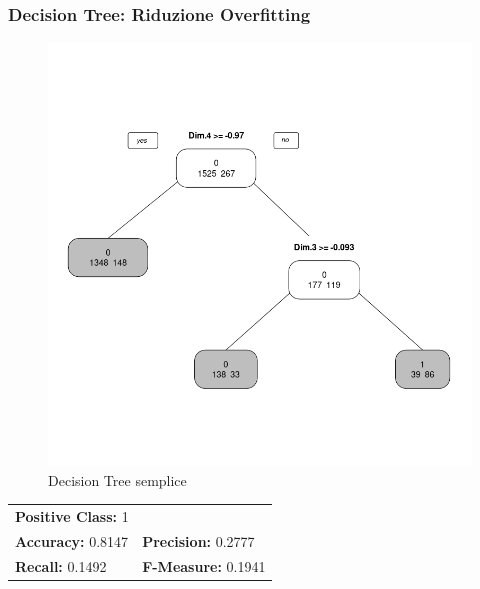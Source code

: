 \begin{frame}[fragile]
\frametitle{Decision Tree: Riduzione Overfitting}
\begin{minipage}{0.45\textwidth}
\begin{figure}
    \centering
    \includegraphics[width=\textwidth]{Img/decision tree/D-TREE002.png}
    \caption{Decision Tree semplice}
    \label{fig:DTREE2}
\end{figure}
\end{minipage}%
\hspace{2em}
\begin{minipage}{0.45\textwidth}

\begin{table}[h!]
\centering
\begin{tabular}{ll}
\multicolumn{2}{l}{\textbf{Positive Class:} 1} \\
\textbf{Accuracy:} 0.8147 & \textbf{Precision:} 0.2777\\
\textbf{Recall:} 0.1492 & \textbf{F-Measure:} 0.1941
\end{tabular}
\end{table}
\end{minipage}%
\end{frame}


